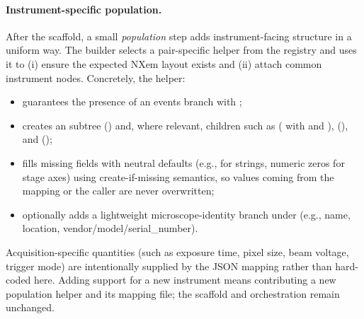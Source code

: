 \paragraph{Instrument-specific population.}
After the scaffold, a small \emph{population} step adds instrument-facing structure in a uniform way. The builder selects a pair-specific helper from the registry and uses it to (i) ensure the expected NXem layout exists and (ii) attach common instrument nodes. Concretely, the helper:
\begin{itemize}
	\item guarantees the presence of an events branch  with ;
	\item creates an  subtree () and, where relevant, children such as  ( with   and  ),  (), and  ();
	\item fills missing fields with neutral defaults (e.g.,  for strings, numeric zeros for stage axes) using create-if-missing semantics, so values coming from the mapping or the caller are never overwritten;
	\item optionally adds a lightweight microscope-identity branch under  (e.g., name, location, vendor/model/serial\_number).
\end{itemize}
Acquisition-specific quantities (such as exposure time, pixel size, beam voltage, trigger mode) are intentionally supplied by the JSON mapping rather than hard-coded here. Adding support for a new instrument means contributing a new population helper and its mapping file; the scaffold and orchestration remain unchanged.

